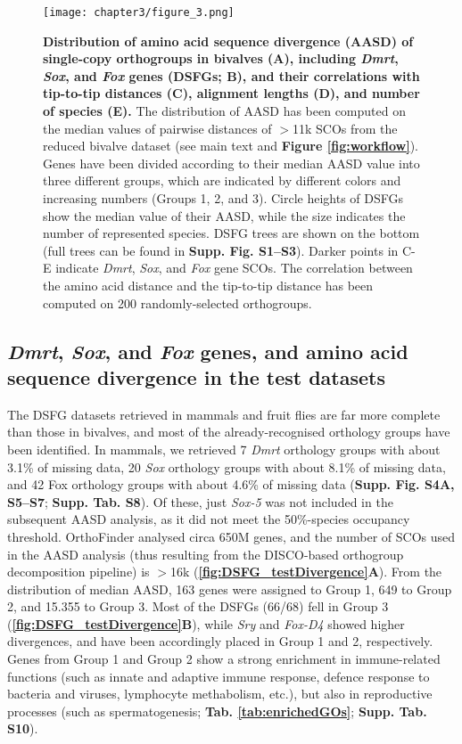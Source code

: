\documentclass[../main.tex]{subfiles}
\begin{document}
\begin{figure}
    \centering
    \texttt{[image: chapter3/figure\_3.png]}
    \captionsetup{width=\textwidth}
    \caption{
    \textbf{Distribution of amino acid sequence divergence (AASD) of single-copy orthogroups in bivalves (A), including \textit{Dmrt}, \textit{Sox}, and \textit{Fox} genes (DSFGs; B), and their correlations with tip-to-tip distances (C), alignment lengths (D), and number of species (E).} The distribution of AASD has been computed on the median values of pairwise distances of $>$11k SCOs from the reduced bivalve dataset (see main text and \textbf{Figure \ref{fig:workflow}}). Genes have been divided according to their median AASD value into three different groups, which are indicated by different colors and increasing numbers (Groups 1, 2, and 3). Circle heights of DSFGs show the median value of their AASD, while the size indicates the number of represented species. DSFG trees are shown on the bottom (full trees can be found in \textbf{Supp. Fig. S1--S3}). Darker points in C-E indicate \textit{Dmrt}, \textit{Sox}, and \textit{Fox} gene SCOs. The correlation between the amino acid distance and the tip-to-tip distance has been computed on 200 randomly-selected orthogroups.
    }
    \label{fig:DSFG_bivalveDivergence}
\end{figure}

\subsection{\textit{Dmrt}, \textit{Sox}, and \textit{Fox} genes, and amino acid sequence divergence in the test datasets} \label{DSFG_test}
The DSFG datasets retrieved in mammals and fruit flies are far more complete than those in bivalves, and most of the already-recognised orthology groups have been identified.
In mammals, we retrieved 7 \textit{Dmrt} orthology groups with about 3.1\% of missing data, 20 \textit{Sox} orthology groups with about 8.1\% of missing data, and 42 Fox orthology groups with about 4.6\% of missing data (\textbf{Supp. Fig. S4A, S5--S7}; \textbf{Supp. Tab. S8}). Of these, just \textit{Sox-5} was not included in the subsequent AASD analysis, as it did not meet the 50\%-species occupancy threshold. OrthoFinder analysed circa 650M genes, and the number of SCOs used in the AASD analysis (thus resulting from the DISCO-based orthogroup decomposition pipeline) is $>$16k (\textbf{\ref{fig:DSFG_testDivergence}A}). From the distribution of median AASD, 163 genes were assigned to Group 1, 649 to Group 2, and 15.355 to Group 3. Most of the DSFGs (66/68) fell in Group 3 (\textbf{\ref{fig:DSFG_testDivergence}B}), while \textit{Sry} and \textit{Fox-D4} showed higher divergences, and have been accordingly placed in Group 1 and 2, respectively. Genes from Group 1 and Group 2 show a strong enrichment in immune-related functions (such as innate and adaptive immune response, defence response to bacteria and viruses, lymphocyte methabolism, etc.), but also in reproductive processes (such as  spermatogenesis; \textbf{Tab. \ref{tab:enrichedGOs}}; \textbf{Supp. Tab. S10}).
\end{document}
